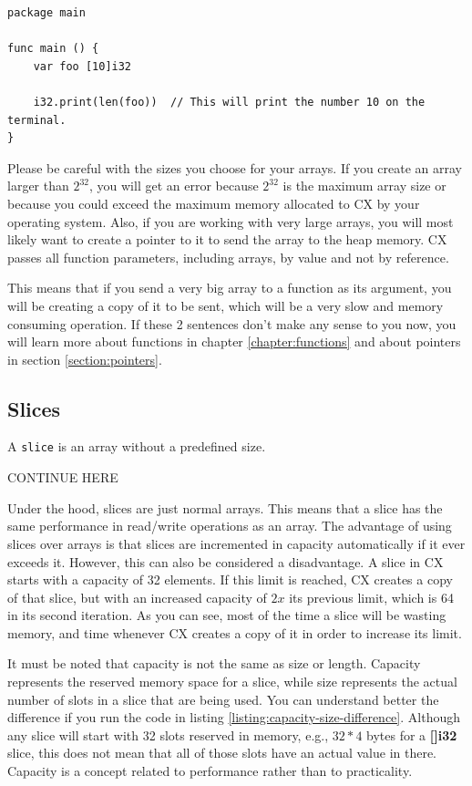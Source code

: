 \documentclass[11pt,fleqn,openany]{book} %
\begin{document}
\begin{lstlisting}[caption={Printing array length},captionpos=b,label={listing:array-len-example}]
package main

func main () {
	var foo [10]i32
    
    i32.print(len(foo))  // This will print the number 10 on the terminal.
}
\end{lstlisting}

Please be careful with the sizes you choose for your arrays. If you create an array larger than $2^{32}$, you will get an error because $2^{32}$ is the maximum array size or because you could exceed the maximum memory allocated to CX by your operating system. Also, if you are working with very large arrays, you will most likely want to create a pointer to it to send the array to the heap memory. CX passes all function parameters, including arrays, by value and not by reference. 

This means that if you send a very big array to a function as its argument, you will be creating a copy of it to be sent, which will be a very slow and memory consuming operation. If these 2 sentences don't make any sense to you now, you will learn more about functions in chapter \ref{chapter:functions} and about pointers in section \ref{section:pointers}.

\subsection{Slices}

A \texttt{slice} is an array without a predefined size.

CONTINUE HERE

Under the hood, slices are just normal arrays. This means that a slice has the same performance in read/write operations as an array. The advantage of using slices over arrays is that slices are incremented in capacity automatically if it ever exceeds it. However, this can also be considered a disadvantage. A slice in CX starts with a capacity of 32 elements. If this limit is reached, CX creates a copy of that slice, but with an increased capacity of $2x$ its previous limit, which is 64 in its second iteration. As you can see, most of the time a slice will be wasting memory, and time whenever CX creates a copy of it in order to increase its limit.

It must be noted that capacity is not the same as size or length. Capacity represents the reserved memory space for a slice, while size represents the actual number of slots in a slice that are being used. You can understand better the difference if you run the code in listing \ref{listing:capacity-size-difference}. Although any slice will start with 32 slots reserved in memory, e.g., $32*4$ bytes for a \textbf{[]i32} slice, this does not mean that all of those slots have an actual value in there. Capacity is a concept related to performance rather than to practicality.
\end{document}
